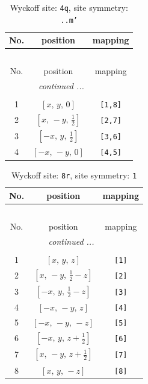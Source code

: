\documentclass[fleqn,8pt]{jsarticle}
\begin{document}
\renewcommand{\arraystretch}{1.2}
\begin{longtable}{ccc}
\caption{Wyckoff site: {\tt 4q}, site symmetry: {\tt ..m'}}
 \\
 \hline \hline
No. & position & mapping \\ \hline \endfirsthead

\multicolumn{2}{l}{\tablename\ \thetable{}} \\
 \hline \hline
No. & position & mapping \\ \hline \endhead

 \hline \hline
\multicolumn{2}{r}{\footnotesize\it continued ...} \\ \endfoot

 \hline \hline
\multicolumn{2}{r}{} \\ \endlastfoot

1 & $\left[ x,\, y,\, 0 \right]$ & {\tt [1,8]} \\ \hline
2 & $\left[ x,\, - y,\, \frac{1}{2} \right]$ & {\tt [2,7]} \\ \hline
3 & $\left[ - x,\, y,\, \frac{1}{2} \right]$ & {\tt [3,6]} \\ \hline
4 & $\left[ - x,\, - y,\, 0 \right]$ & {\tt [4,5]} \\
\end{longtable}
\renewcommand{\arraystretch}{1.2}
\begin{longtable}{ccc}
\caption{Wyckoff site: {\tt 8r}, site symmetry: {\tt 1}}
 \\
 \hline \hline
No. & position & mapping \\ \hline \endfirsthead

\multicolumn{2}{l}{\tablename\ \thetable{}} \\
 \hline \hline
No. & position & mapping \\ \hline \endhead

 \hline \hline
\multicolumn{2}{r}{\footnotesize\it continued ...} \\ \endfoot

 \hline \hline
\multicolumn{2}{r}{} \\ \endlastfoot

1 & $\left[ x,\, y,\, z \right]$ & {\tt [1]} \\ \hline
2 & $\left[ x,\, - y,\, \frac{1}{2} - z \right]$ & {\tt [2]} \\ \hline
3 & $\left[ - x,\, y,\, \frac{1}{2} - z \right]$ & {\tt [3]} \\ \hline
4 & $\left[ - x,\, - y,\, z \right]$ & {\tt [4]} \\ \hline
5 & $\left[ - x,\, - y,\, - z \right]$ & {\tt [5]} \\ \hline
6 & $\left[ - x,\, y,\, z + \frac{1}{2} \right]$ & {\tt [6]} \\ \hline
7 & $\left[ x,\, - y,\, z + \frac{1}{2} \right]$ & {\tt [7]} \\ \hline
8 & $\left[ x,\, y,\, - z \right]$ & {\tt [8]} \\
\end{longtable}
\end{document}
